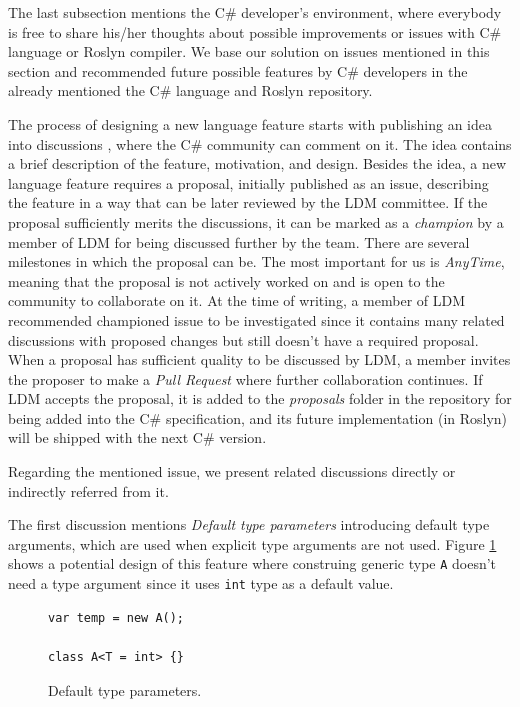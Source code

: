 The last subsection mentions the C\# developer's environment, where everybody is free to share his/her thoughts about possible improvements or issues with C\# language or Roslyn compiler.
We base our solution on issues mentioned in this section and recommended future possible features by C\# developers in the already mentioned the C\# language and Roslyn repository.
\par
{}
The process of designing a new language feature starts with publishing an idea into discussions \cite{online:discussions}, where the C\# community can comment on it. 
The idea contains a brief description of the feature, motivation, and design. 
Besides the idea, a new language feature requires a proposal, initially published as an issue, describing the feature in a way that can be later reviewed by the \ac{LDM} committee.
If the proposal sufficiently merits the discussions, it can be marked as a \textit{champion} by a member of \ac{LDM} for being discussed further by the team. 
There are several milestones in which the proposal can be. 
The most important for us is \textit{AnyTime}, meaning that the proposal is not actively worked on and is open to the community to collaborate on it. 
At the time of writing, a member of \ac{LDM} recommended championed issue \cite{online:champion} to be investigated since it contains many related discussions with proposed changes but still doesn’t have a required proposal. 
When a proposal has sufficient quality to be discussed by \ac{LDM}, a member invites the proposer to make a \textit{Pull Request} where further collaboration continues. 
If \ac{LDM} accepts the proposal, it is added to the \textit{proposals} folder in the repository for being added into the C\# specification, and its future implementation (in Roslyn) will be shipped with the next C\# version. 
\par
{}
Regarding the mentioned issue, we present related discussions directly or indirectly referred from it.
\par
{}
The first discussion \cite{online:DefTypeParam} mentions \textit{Default type parameters} introducing default type arguments, which are used when explicit type arguments are not used. 
Figure \ref{img59:defTypeParam} shows a potential design of this feature where construing generic type \texttt{A} doesn’t need a type argument since it uses \texttt{int} type as a default value. 
\par
\begin{figure}
\begin{lstlisting}[style=csharp]
var temp = new A();

class A<T = int> {}
\end{lstlisting}
\caption{Default type parameters.}
\label{img59:defTypeParam}
\end{figure}
